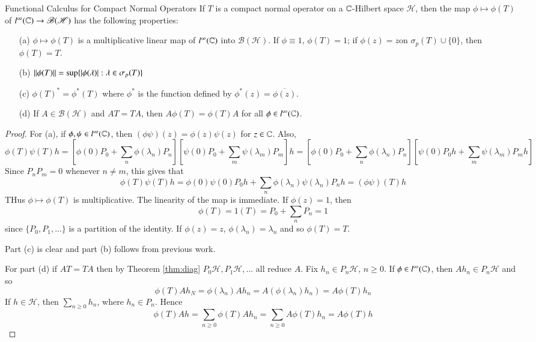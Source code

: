 \begin{nthm}{Functional Calculus for Compact Normal Operators}
    If $T$ is a compact normal operator on a $\mathbb C$-Hilbert space $\mathscr{H}$, then the map $\phi\mapsto \phi(T)$ of $l^{\infty}(\mathbb C)\rightarrow \mathscr{B}(\mathscr{H})$ has the following properties: \begin{enumerate}
        \item[(a)] $\phi\mapsto \phi(T)$ is a multiplicative linear map of $l^{\infty}(\mathbb C)$ into $\mathscr{B}(\mathscr{H})$. If $\phi\equiv 1$, $\phi(T) = 1$; if $\phi(z) = z$on $\sigma_p(T)\cup \{0\}$, then $\phi(T) = T$.
        \item[(b)] $\left|\left| \phi(T)\right|\right| = \sup\{|\phi(\lambda)|:\lambda \in \sigma_p(T)\}$
        \item[(c)] $\phi(T)^* = \phi^*(T)$ where $\phi^*$ is the function defined by $\phi^*(z) = \overline{\phi(z)}$.
        \item[(d)] If $A \in \mathscr{B}(\mathscr{H})$ and $AT= TA$, then $A\phi(T) = \phi(T)A$ for all $\phi \in l^{\infty}(\mathbb C)$.
    \end{enumerate}
\end{nthm}
\begin{proof}
    For (a), if $\phi,\psi \in l^{\infty}(\mathbb C)$, then $(\phi\psi)(z) = \phi(z)\psi(z)$ for $z \in \mathbb C$. Also, $$\phi(T)\psi(T)h = \left[\phi(0)P_0+\sum_n\phi(\lambda_n)P_n\right]\left[\psi(0)P_0+\sum_m\psi(\lambda_m)P_m\right]h = \left[\phi(0)P_0+\sum_n\phi(\lambda_n)P_n\right]\left[\psi(0)P_0h+\sum_m\psi(\lambda_m)P_mh\right]$$
    Since $P_nP_m = 0$ whenever $n \neq m$, this gives that $$\phi(T)\psi(T)h = \phi(0)\psi(0)P_0h + \sum_n\phi(\lambda_n)\psi(\lambda_n)P_nh = (\phi\psi)(T)h$$
    THus $\phi\mapsto \phi(T)$ is multiplicative. The linearity of the map is immediate. If $\phi(z) = 1$, then $$\phi(T) = 1(T) = P_0 + \sum_nP_n = 1$$
    since $\{P_0,P_1,...\}$ is a partition of the identity. If $\phi(z) = z$, $\phi(\lambda_n) = \lambda_n$ and so $\phi(T) = T$.

    Part (c) is clear and part (b) follows from previous work.

    For part (d) if $AT = TA$ then by Theorem \ref{thm:diag} $P_0\mathscr{H},P_1\mathscr{H},...$ all reduce $A$. Fix $h_n \in P_n\mathscr{H}$, $n \geq 0$. If $\phi \in l^{\infty}(\mathbb C)$, then $Ah_n \in P_n\mathscr{H}$ and so $$\phi(T)Ah_N = \phi(\lambda_n)Ah_n = A(\phi(\lambda_n)h_n) = A\phi(T)h_n$$
    If $h \in \mathscr{H}$, then $\sum_{n\geq 0}h_n$, where $h_n \in P_n$. Hence $$\phi(T)Ah = \sum_{n\geq 0}\phi(T)Ah_n = \sum_{n\geq 0}A\phi(T)h_n = A\phi(T)h$$
\end{proof}

